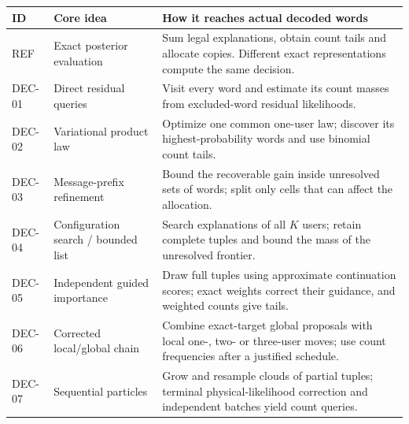 \documentclass[10pt,a4paper]{article}
\begin{document}
\begin{center}\small
\begin{tabularx}{\textwidth}{@{}p{}p{}Y@{}}\toprule
ID & Core idea & How it reaches actual decoded words\\\midrule
REF & Exact posterior evaluation & Sum legal explanations, obtain count tails and allocate copies. Different exact representations compute the same decision.\\
DEC-01 & Direct residual queries & Visit every word and estimate its count masses from excluded-word residual likelihoods.\\
DEC-02 & Variational product law & Optimize one common one-user law; discover its highest-probability words and use binomial count tails.\\
DEC-03 & Message-prefix refinement & Bound the recoverable gain inside unresolved sets of words; split only cells that can affect the allocation.\\
DEC-04 & Configuration search / bounded list & Search explanations of all $K$ users; retain complete tuples and bound the mass of the unresolved frontier.\\
DEC-05 & Independent guided importance & Draw full tuples using approximate continuation scores; exact weights correct their guidance, and weighted counts give tails.\\
DEC-06 & Corrected local/global chain & Combine exact-target global proposals with local one-, two- or three-user moves; use count frequencies after a justified schedule.\\
DEC-07 & Sequential particles & Grow and resample clouds of partial tuples; terminal physical-likelihood correction and independent batches yield count queries.\\\bottomrule
\end{tabularx}
\end{center}
\end{document}

